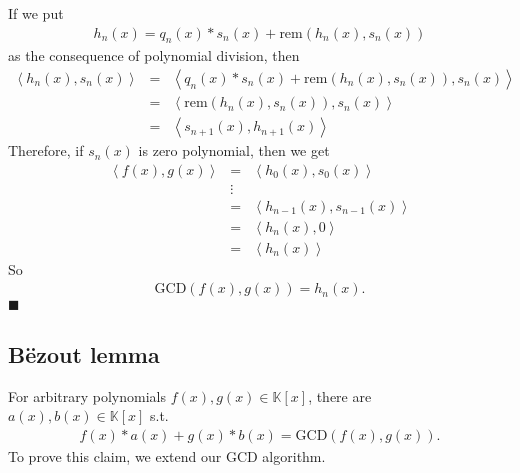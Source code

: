 \documentclass[11pt]{book}
\begin{document}
If we put
\begin{eqnarray}
h_n(x) = q_n(x)*s_n(x) + \text{rem}\left( h_n(x), s_n(x) \right)
\end{eqnarray}
as the consequence of polynomial division, then
\begin{eqnarray}
\left<h_n(x), s_n(x) \right>
&=& \left< q_n(x)*s_n(x) + \text{rem}\left( h_n(x), s_n(x) \right), s_n(x) \right> \qquad\\
&=& \left<\text{rem}\left( h_n(x), s_n(x) \right), s_n(x) \right> \\
&=& \left<s_{n+1}(x), h_{n+1}(x) \right>
\end{eqnarray}
Therefore, if $s_n(x)$ is zero polynomial, then we get
\begin{eqnarray}
\left<  f(x), g(x) \right>
&=& \left<h_0(x), s_0(x) \right> \\
\nonumber
&\vdots& \\
&=& \left<h_{n-1}(x), s_{n-1}(x) \right> \\
&=& \left<h_n(x), 0 \right> \\
&=& \left<h_n(x)\right>
\end{eqnarray}
So
\begin{eqnarray}
\text{GCD}\left( f(x), g(x) \right) = h_n(x).
\end{eqnarray}
$\blacksquare$

\subsection{B\"ezout lemma}
\label{BezoutLemma}
For arbitrary polynomials $f(x), g(x) \in \mathbb{K}[x]$, there are $a(x), b(x) \in \mathbb{K}[x]$ s.t.
\begin{eqnarray}
f(x) * a(x) + g(x) * b(x) = \text{GCD}\left( f(x), g(x) \right).
\end{eqnarray}
To prove this claim, we extend our GCD algorithm.
\end{document}
